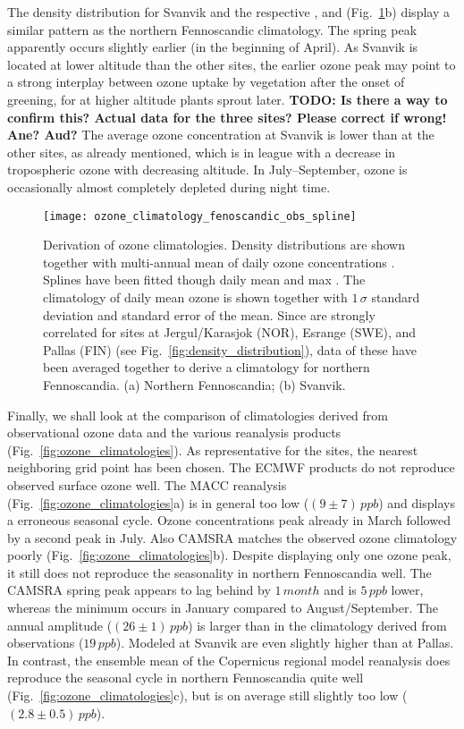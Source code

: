 \documentclass[bg, manuscript]{copernicus}
\begin{document}
The density distribution for Svanvik and the respective , and  (Fig.~\ref{fig:ozone_climatology_fenoscandic_obs_spline}b) display a similar pattern as the northern Fennoscandic climatology. The spring peak apparently occurs slightly earlier (in the beginning of April). As Svanvik is located at lower altitude than the other sites, the earlier ozone peak may point to a strong interplay between ozone uptake by vegetation after the onset of greening, for at higher altitude plants sprout later. {\bf TODO: Is there a way to confirm this? Actual data for the three sites? Please correct if wrong! Ane? Aud?} The average ozone concentration at Svanvik is lower than at the other sites, as already mentioned, which is in league with a decrease in tropospheric ozone with decreasing altitude. In July--September, ozone is occasionally almost completely depleted during night time.

\begin{figure}[t]
  \texttt{[image: ozone\_climatology\_fenoscandic\_obs\_spline]}
  \caption{Derivation of ozone climatologies. Density distributions are shown together with multi-annual mean of daily ozone concentrations \chem{[O_3]}. Splines have been fitted though daily mean and max \chem{[O_3]}. The climatology of daily mean ozone is shown together with $1\,\sigma$ standard deviation and standard error of the mean. Since \chem{[O_3]} are strongly correlated for sites at Jergul/Karasjok (NOR), Esrange (SWE), and Pallas (FIN) (see Fig.~\ref{fig:density_distribution}), data of these have been averaged together to derive a climatology for northern Fennoscandia. (a) Northern Fennoscandia; (b) Svanvik.}
  \label{fig:ozone_climatology_fenoscandic_obs_spline}
\end{figure}

Finally, we shall look at the comparison of climatologies derived from observational ozone data and the various reanalysis products (Fig.~\ref{fig:ozone_climatologies}). As representative for the sites, the nearest neighboring grid point has been chosen. The ECMWF products do not reproduce observed surface ozone well. The MACC reanalysis (Fig.~\ref{fig:ozone_climatologies}a) is in general too low ($(9\pm 7)\,\unit{ppb}$) and displays a erroneous seasonal cycle. Ozone concentrations peak already in March followed by a second peak in July. Also CAMSRA matches the observed ozone climatology poorly (Fig.~\ref{fig:ozone_climatologies}b). Despite displaying only one ozone peak, it still does not reproduce the seasonality in northern Fennoscandia well. The CAMSRA spring peak appears to lag behind by $1\,\unit{month}$ and is $5\,\unit{ppb}$ lower, whereas the minimum occurs in January compared to August/September. The annual amplitude ($(26\pm 1)\,\unit{ppb}$) is larger than in the climatology derived from observations ($19\,\unit{ppb}$). Modeled \chem{[O_3]} at Svanvik are even slightly higher than at Pallas. In contrast, the ensemble mean of the Copernicus regional model reanalysis does reproduce the seasonal cycle in northern Fennoscandia quite well (Fig.~\ref{fig:ozone_climatologies}c), but is on average still slightly too low ($(2.8\pm 0.5)\,\unit{ppb}$).
\end{document}

